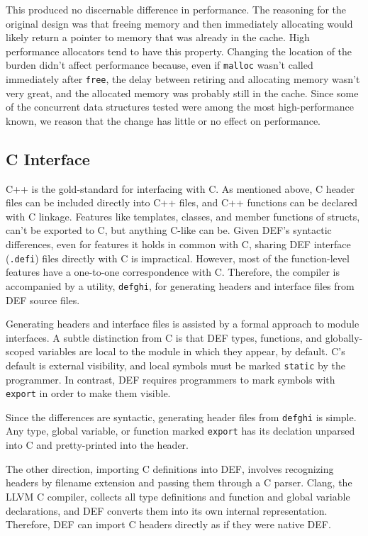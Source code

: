 This produced no discernable difference in performance.  The reasoning for the original design was that freeing memory and then immediately allocating would likely return a pointer to memory that was already in the cache.  High performance allocators tend to have this property.  Changing the location of the burden didn't affect performance because, even if \texttt{malloc} wasn't called immediately after \texttt{free}, the delay between retiring and allocating memory wasn't very great, and the allocated memory was probably still in the cache.  Since some of the concurrent data structures tested were among the most high-performance known, we reason that the change has little or no effect on performance.

\subsection{C Interface}

C++ is the gold-standard for interfacing with C.  As mentioned above, C header files can be included directly into C++ files, and C++ functions can be declared with C linkage.  Features like templates, classes, and member functions of structs, can't be exported to C, but anything C-like can be.  Given DEF's syntactic differences, even for features it holds in common with C, sharing DEF interface (\texttt{.defi}) files directly with C is impractical.  However, most of the function-level features have a one-to-one correspondence with C.  Therefore, the compiler is accompanied by a utility, \texttt{defghi}, for generating headers and interface files from DEF source files.

Generating headers and interface files is assisted by a formal approach to module interfaces.  A subtle distinction from C is that DEF types, functions, and globally-scoped variables are local to the module in which they appear, by default.  C's default is external visibility, and local symbols must be marked \texttt{static} by the programmer.  In contrast, DEF requires programmers to mark symbols with \texttt{export} in order to make them visible.

Since the differences are syntactic, generating header files from \texttt{defghi} is simple.  Any type, global variable, or function marked \texttt{export} has its declation unparsed into C and pretty-printed into the header.

The other direction, importing C definitions into DEF, involves recognizing headers by filename extension and passing them through a C parser.  Clang, the LLVM C compiler, collects all type definitions and function and global variable declarations, and DEF converts them into its own internal representation.  Therefore, DEF can import C headers directly as if they were native DEF.

